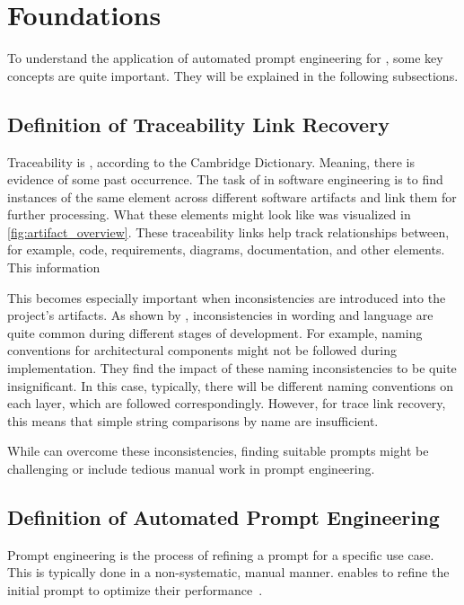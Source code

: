 \chapter{Foundations}

To understand the application of automated prompt engineering for \TLR, some key concepts are quite important.
They will be explained in the following subsections.


\section{Definition of Traceability Link Recovery}
Traceability is , according to the Cambridge Dictionary.
Meaning, there is evidence of some past occurrence.
The task of \TLR in software engineering is to find instances of the same element across different software artifacts and link them for further processing.
What these elements might look like was visualized in \autoref{fig:artifact_overview}.
These traceability links help track relationships between, for example, code, requirements, diagrams, documentation, and other elements.
This information 

This becomes especially important when inconsistencies are introduced into the project's artifacts.
As shown by , inconsistencies in wording and language are quite common during different stages of development.
For example, naming conventions for architectural components might not be followed during implementation.
They find the impact of these naming inconsistencies to be quite insignificant.
In this case, typically, there will be different naming conventions on each layer, which are followed correspondingly.
However, for trace link recovery, this means that simple string comparisons by name are insufficient.

While \LLMs can overcome these inconsistencies, finding suitable prompts might be challenging or include tedious manual work in prompt engineering. 


\section{Definition of Automated Prompt Engineering}
\label{foundations:sec:automated_prompt_engineering}
Prompt engineering is the process of refining a prompt for a specific use case.
This is typically done in a non-systematic, manual manner. \APE enables \LLMs to refine the initial prompt to optimize their performance~\cite{zadenoori2025AutomaticPrompt}.

